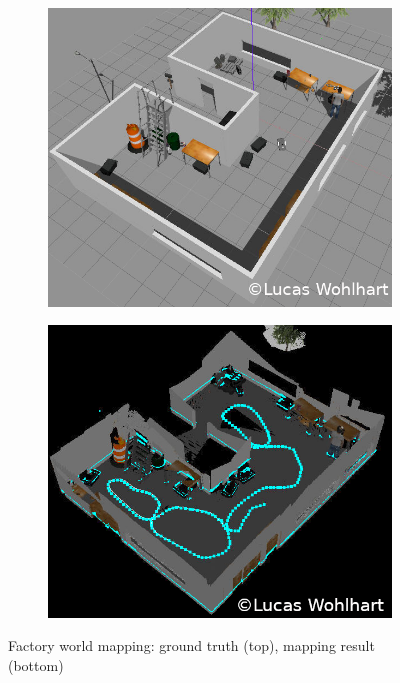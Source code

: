 \documentclass[10pt,journal,compsoc]{IEEEtran}
\begin{document}
\begin{figure}[thpb]
    \centering
    \begin{subfigure}[b]{0.45\textwidth}
        \includegraphics[width=\linewidth]{img/factory_map_ground_truth.png}
    \end{subfigure}
    
    \begin{subfigure}[b]{0.45\textwidth}
        \includegraphics[width=\linewidth]{img/factory_map.png}
    \end{subfigure}
    
    \caption{\label{fig:factory_map}Factory world mapping: ground truth (top), mapping result (bottom)}    
\end{figure}
\end{document}
